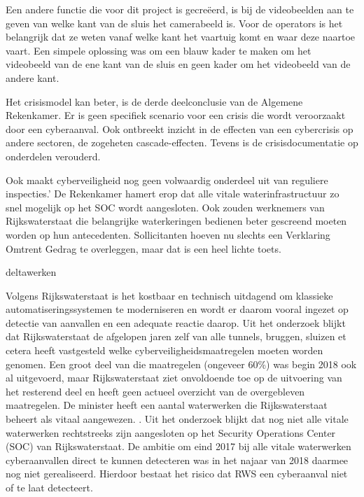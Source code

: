 Een andere functie die voor dit project is gecreëerd, is bij de videobeelden aan te geven van welke kant van de sluis het camerabeeld is. Voor de operators is het belangrijk dat ze weten vanaf welke kant het vaartuig komt en waar deze naartoe vaart. Een simpele oplossing was om een blauw kader te maken om het videobeeld van de ene kant van de sluis en geen kader om het videobeeld van de andere kant. 


\cite{thkwaterwerken}
Het crisismodel kan beter, is de derde deelconclusie van de Algemene Rekenkamer. Er is geen specifiek scenario voor een crisis die wordt veroorzaakt door een cyberaanval. Ook ontbreekt inzicht in de effecten van een cybercrisis op andere sectoren, de zogeheten cascade-effecten. Tevens is de crisisdocumentatie op onderdelen verouderd.

\cite{rekenkamercybersecWater}
Ook maakt cyberveiligheid nog geen volwaardig onderdeel uit van reguliere inspecties.’ De Rekenkamer hamert erop dat alle vitale waterinfrastructuur zo snel mogelijk op het SOC wordt aangesloten. Ook zouden werknemers van Rijkswaterstaat die belangrijke waterkeringen bedienen beter gescreend moeten worden op hun antecedenten. Sollicitanten hoeven nu slechts een Verklaring Omtrent Gedrag te overleggen, maar dat is een heel lichte toets.

\cite{hackerWaterwerk}
deltawerken

\cite{kramerZeeland}
Volgens Rijkswaterstaat is het kostbaar en technisch uitdagend om klassieke automatiseringssystemen te moderniseren en wordt er daarom vooral ingezet op detectie van aanvallen en een adequate reactie daarop.
Uit het onderzoek blijkt dat Rijkswaterstaat de afgelopen jaren zelf van alle tunnels, bruggen, sluizen et cetera heeft vastgesteld welke cyberveiligheidsmaatregelen moeten worden genomen. Een groot deel van die maatregelen (ongeveer 60\%) was begin 2018 ook al uitgevoerd, maar Rijkswaterstaat ziet onvoldoende toe op de uitvoering van het resterend deel en heeft geen actueel overzicht van de overgebleven maatregelen.
De minister heeft een aantal waterwerken die Rijkswaterstaat beheert als vitaal aangewezen. . Uit het onderzoek blijkt dat nog niet alle vitale waterwerken rechtstreeks zijn aangesloten op het Security Operations Center (SOC) van Rijkswaterstaat. De ambitie om eind 2017 bij alle vitale waterwerken cyberaanvallen direct te kunnen detecteren was in het najaar van 2018 daarmee nog niet gerealiseerd. Hierdoor bestaat het risico dat RWS een cyberaanval niet of te laat detecteert.

